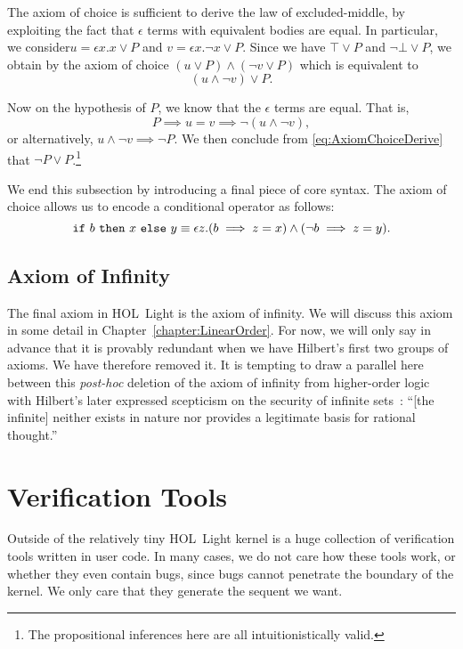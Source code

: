 The axiom of choice is sufficient to derive the law of excluded-middle, by exploiting the fact that $\epsilon$ terms with equivalent bodies are equal. In particular, we consider\linebreak $u = \epsilon x. x \vee P$ and $v = \epsilon x. \neg x \vee P$. Since we have $\top \vee P$ and $\neg \bot \vee P$, we obtain by the axiom of choice $(u \vee P) \wedge (\neg v \vee P)$ which is equivalent to
\begin{equation}
 (u \wedge \neg v) \vee P.\label{eq:AxiomChoiceDerive}
\end{equation}

Now on the hypothesis of $P$, we know that the $\epsilon$ terms are equal. That is,
\begin{displaymath}
P \implies u = v \implies \neg (u \wedge \neg v),
\end{displaymath}
or alternatively, $u \wedge \neg v \implies \neg P$. We then conclude from \eqref{eq:AxiomChoiceDerive} that $\neg P \vee P$.\footnote{The propositional inferences here are all intuitionistically valid.}

We end this subsection by introducing a final piece of core syntax. The axiom of choice allows us to encode a conditional operator as follows:
\begin{equation}
\code{if}\ b\ \code{then}\ x\ \code{else}\ y \equiv \epsilon z. (b \implies z = x) \wedge (\neg b \implies z = y) .
\end{equation}

\subsection{Axiom of Infinity}\label{sec:InfinityDescription}
The final axiom in HOL~Light is the axiom of infinity. We will discuss this axiom in some detail in Chapter~\ref{chapter:LinearOrder}. For now, we will only say in advance that it is provably redundant when we have Hilbert's first two groups of axioms. We have therefore removed it. It is tempting to draw a parallel here between this \emph{post-hoc} deletion of the axiom of infinity from higher-order logic with Hilbert's later expressed scepticism on the security of infinite sets~\cite{OnInfinite}: ``[the infinite] neither exists in nature nor provides a legitimate basis for rational thought.''

\section{Verification Tools}\label{sec:UserTools}
Outside of the relatively tiny HOL~Light kernel is a huge collection of verification tools written in user code. In many cases, we do not care how these tools work, or whether they even contain bugs, since bugs cannot penetrate the boundary of the kernel. We only care that they generate the sequent we want.

